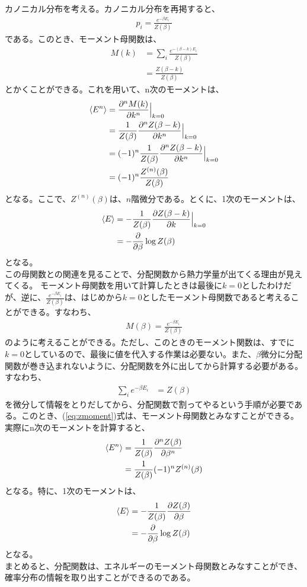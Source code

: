 \documentclass[a4paper,11pt]{jsarticle}
\numberwithin{equation}{section}
\begin{document}
カノニカル分布を考える。カノニカル分布を再掲すると、
\begin{align}
  p_i = \frac{e^{-\beta E_i}}{Z(\beta)}
\end{align}
である。このとき、モーメント母関数は、
\begin{align}
  M(k) &= \sum_{i}\frac{e^{-(\beta - k)E_i}}{Z(\beta)}\\
  &= \frac{Z(\beta - k)}{Z(\beta)}
\end{align}
とかくことができる。これを用いて、n次のモーメントは、
\begin{align}
  \expval{E^n} &= \pdv[n]{M(k)}{k}\Big|_{k=0}\\
  &= \frac{1}{Z(\beta)}\pdv[n]{Z(\beta - k)}{k}\Big|_{k=0}\\
  &= (-1)^n\frac{1}{Z(\beta)}\pdv[n]{Z(\beta-k)}{k}\Big|_{k=0}\\
  &= (-1)^n\frac{Z^{(n)}(\beta)}{Z(\beta)}
\end{align}
となる。ここで、$Z^{(n)}(\beta)$は、$n$階微分である。とくに、1次のモーメントは、
\begin{align}
  \expval{E} &= -\frac{1}{Z(\beta)}\pdv{Z(\beta - k)}{k}\Big|_{k=0}\\
  &= -\pdv{\beta}\log Z(\beta)
\end{align}
となる。\\
この母関数との関連を見ることで、分配関数から熱力学量が出てくる理由が見えてくる。
モーメント母関数を用いて計算したときは最後に$k=0$としたわけだが、逆に、$\frac{e^{-\beta E_i}}{Z(\beta)}$は、はじめから$k=0$としたモーメント母関数であると考えることができる。すなわち、
\begin{align}
  M(\beta) = \frac{e^{-\beta E_i}}{Z(\beta)}
\end{align}
のように考えることができる。ただし、このときのモーメント関数は、すでに$k=0$としているので、最後に値を代入する作業は必要ない。また、$\beta$微分に分配関数が巻き込まれないように、分配関数を外に出してから計算する必要がある。すなわち、
\begin{align}
  \sum_{i} e^{-\beta E_i} &= Z(\beta) \label{eq:zmoment}
\end{align}
を微分して情報をとりだしてから、分配関数で割ってやるという手順が必要である。このとき、(\ref{eq:zmoment})式は、モーメント母関数とみなすことができる。\\
実際にn次のモーメントを計算すると、
\begin{align}
  \expval{E^n} &= \frac{1}{Z(\beta)}\pdv[n]{Z(\beta)}{\beta}\\
  &= \frac{1}{Z(\beta)}(-1)^nZ^{(n)}(\beta)
\end{align}
となる。特に、1次のモーメントは、
\begin{align}
  \expval{E} &= -\frac{1}{Z(\beta)}\pdv{Z(\beta)}{\beta}\\
  &= -\pdv{\beta}\log Z(\beta)
\end{align}
となる。\\
まとめると、分配関数は、エネルギーのモーメント母関数とみなすことができ、確率分布の情報を取り出すことができるのである。\\ 
\end{document}
